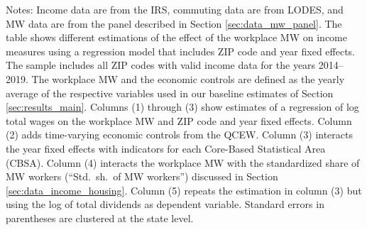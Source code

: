 \begin{table}[hbt!]
    \begin{minipage}{.95\textwidth} \footnotesize
        \vspace{2mm}
        Notes: 
        Income data are from the IRS, commuting data are from LODES, and MW
        data are from the panel described in Section \ref{sec:data_mw_panel}.
        The table shows different estimations of the effect of the workplace MW
        on income measures using a regression model that includes ZIP code and 
        year fixed effects.
        The sample includes all ZIP codes with valid income data for the years 
        2014--2019.
        The workplace MW and the economic controls are defined as the yearly 
        average of the respective variables used in our baseline estimates of 
        Section \ref{sec:results_main}.
        Columns (1) through (3) show estimates of a regression of log total wages
        on the workplace MW and ZIP code and year fixed effects.
        Column (2) adds time-varying economic controls from the QCEW.
        Column (3) interacts the year fixed effects with indicators for each
        Core-Based Statistical Area (CBSA).
        Column (4) interacts the workplace MW with the standardized share of MW 
        workers (``Std.\ sh.\ of MW workers'') discussed in Section 
        \ref{sec:data_income_housing}.
        Column (5) repeats the estimation in column (3) but using the log of 
        total dividends as dependent variable.
        Standard errors in parentheses are clustered at the state level.
    \end{minipage}
\end{table}

